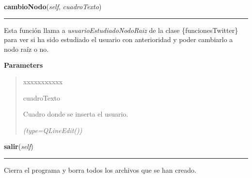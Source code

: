     \label{manejoGrafico:ManejoGrafico:cambioNodo}

    \vspace{0.5ex}

\hspace{.8\funcindent}\begin{boxedminipage}{\funcwidth}

    \raggedright \textbf{cambioNodo}(\textit{self}, \textit{cuadroTexto})

    \vspace{-1.5ex}

    \rule{\textwidth}{0.5\fboxrule}
\setlength{\parskip}{2ex}
    Esta función llama a \textit{usuarioEstudiadoNodoRaiz} de la clase 
    \{funcionesTwitter\} para ver si ha sido estudiado el usuario con 
    anterioridad y poder cambiarlo a nodo raíz o no.

\setlength{\parskip}{1ex}
      \textbf{Parameters}
      \vspace{-1ex}

      \begin{quote}
        \begin{Ventry}{xxxxxxxxxxx}

          \item[cuadroTexto]

          Cuadro donde se inserta el usuario.

            {\it (type=QLineEdit())}

        \end{Ventry}

      \end{quote}

    \end{boxedminipage}

    \label{manejoGrafico:ManejoGrafico:salir}

    \vspace{0.5ex}

\hspace{.8\funcindent}\begin{boxedminipage}{\funcwidth}

    \raggedright \textbf{salir}(\textit{self})

    \vspace{-1.5ex}

    \rule{\textwidth}{0.5\fboxrule}
\setlength{\parskip}{2ex}
    Cierra el programa y borra todos los archivos que se han creado.

\setlength{\parskip}{1ex}
    \end{boxedminipage}

